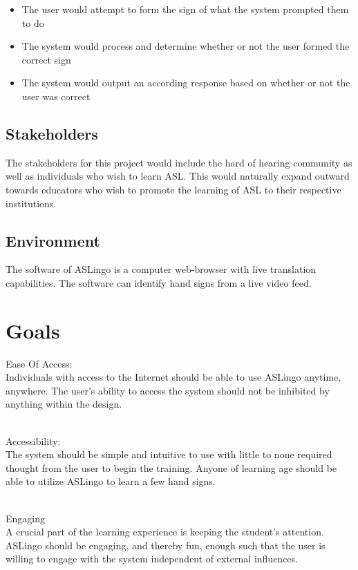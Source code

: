 \documentclass{article}
\begin{document}
\begin{itemize}
    \item The user would attempt to form the sign of what the system prompted them to do
    \item The system would process and determine whether or not the user formed the correct sign
    \item The system would output an according response based on whether or not the user was correct
\end{itemize}

\subsection{Stakeholders}
 The stakeholders for this project would include the hard of hearing community as well as individuals who wish to learn ASL. This would naturally expand outward towards educators who wish to promote the learning of ASL to their respective institutions.

\subsection{Environment}
The software of ASLingo is a computer web-browser with live translation capabilities. The software can identify hand signs from a live video feed.

\section{Goals}

Ease Of Access:\\
Individuals with access to the Internet should be able to use ASLingo anytime, anywhere. The user's ability to access the system should not be inhibited by anything within the design.

~\\Accessibility:\\
The system should be simple and intuitive to use with little to none required thought from the user to begin the training. Anyone of learning age should be able to utilize ASLingo to learn a few hand signs. 

~\\Engaging\\
A crucial part of the learning experience is keeping the student's attention. ASLingo should be engaging, and thereby fun, enough such that the user is willing to engage with the system independent of external influences.
\end{document}
